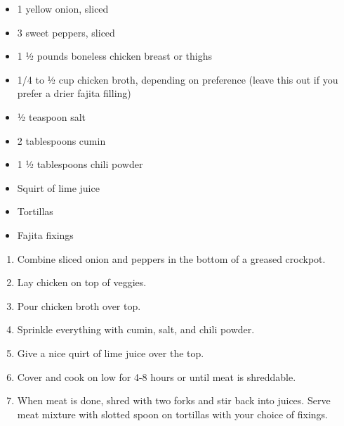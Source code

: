 
\begin{itemize}
\item
  1 yellow onion, sliced
\item
  3 sweet peppers, sliced
\item
  1 ½ pounds boneless chicken breast or thighs
\item
  1/4 to ½ cup chicken broth, depending on preference (leave this out if
  you prefer a drier fajita filling)
\item
  ½ teaspoon salt
\item
  2 tablespoons cumin
\item
  1 ½ tablespoons chili powder
\item
  Squirt of lime juice
\item
  Tortillas
\item
  Fajita fixings
\end{itemize}

\begin{enumerate}
\def\labelenumi{\arabic{enumi}.}
\item
  Combine sliced onion and peppers in the bottom of a greased crockpot.
\item
  Lay chicken on top of veggies.
\item
  Pour chicken broth over top.
\item
  Sprinkle everything with cumin, salt, and chili powder.
\item
  Give a nice quirt of lime juice over the top.
\item
  Cover and cook on low for 4-8 hours or until meat is shreddable.
\item
  When meat is done, shred with two forks and stir back into juices.
  Serve meat mixture with slotted spoon on tortillas with your choice of
  fixings.
\end{enumerate}
